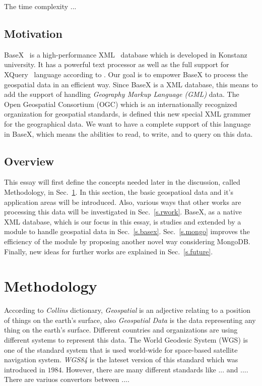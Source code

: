 \documentclass[a4paper,12pt]{article}
\begin{document}
The time complexity ...

\subsection{Motivation}
BaseX~\cite{www/basex} is a high-performance XML~\cite{www/xml}
 database which is developed in Konstanz university.
It has a powerful text processor as well as the full support 
for XQuery~\cite{www/xquery,www/xqueryfun} language according to \cite{conf/xsym/GrunGHS09}.
Our goal is to empower BaseX to process the geospatial data in an efficient way.
Since BaseX is a XML database, this means to add the support of handling 
\emph{Geography Markup Language (GML)} data. The Open Geospatial Consortium (OGC)
which is an internationally recognized organization for geospatial standards,
is defined this new special XML grammer for the geographical data.
We want to have a complete support of this language in BaseX,
which means the abilities to read, to write, and to query on this data.


\subsection{Overview}
This essay will first define the concepts needed later in the discussion, called
Methodology, in Sec.~\ref{s.method}. In this section, the basic geospatioal data
and it's application areas will be introduced. Also, various ways that other works
are processing this data will be investigated in Sec.~\ref{s.rwork}. BaseX,
as a native XML database, which is our focus in this essay, is studies and extended
by a module to handle geospatial data in Sec.~\ref{s.basex}. 
Sec.~\ref{s.mongo} improves the efficiency of the module
by proposing another novel way considering MongoDB.
Finally, new ideas for further works are explained in
Sec.~\ref{s.future}.


\newpage
\section{Methodology}
\label{s.method}
According to \emph{Collins} dictionary, \emph{Geospatial} is an adjective relating to a position of things on the
earth's surface, also \emph{Geospatial Data} is the data representing any thing on the earth's surface. Different 
countries and organizations are using different systems to represent this data. 
The World Geodesic System (WGS) is one of the standard system that is used world-wide 
for space-based satellite navigation system. \emph{WGS84} is the lateset version of this standard which
was introduced in $1984$. However, there are many different standards like ... and .... 
There are variuos convertors between ....
\end{document}
